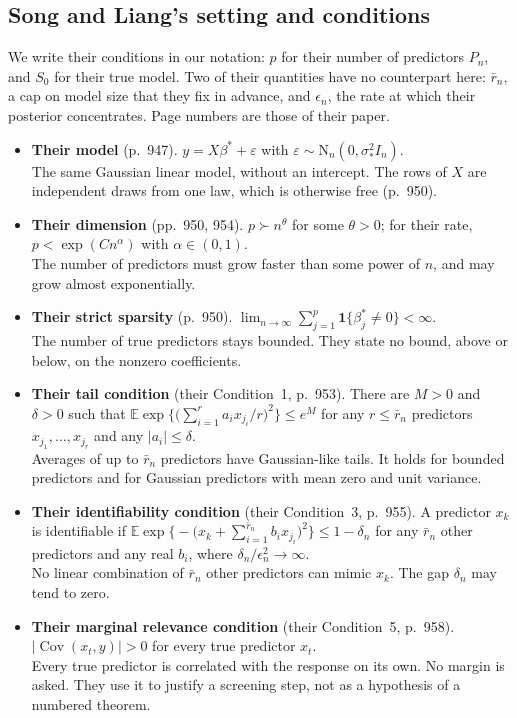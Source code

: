 \documentclass[11pt]{article}
\newcommand{\E}{\mathbb{E}}
\newcommand{\N}{\mathrm{N}}
\newcommand{\abs}[1]{\lvert #1\rvert}
\newcommand{\ind}[1]{\mathbf{1}\{#1\}}
\newcommand{\Cov}{\operatorname{Cov}}
\newcommand{\bstar}{\beta^*}
\newcommand{\sigs}{\sigma_*}
\newcommand{\Sz}{S_0}
\theoremstyle{plain}
\theoremstyle{definition}
\begin{document}
\subsection*{Song and Liang's setting and conditions}

We write their conditions in our notation: $p$ for their number of predictors $P_n$, and $\Sz$ for their true model.
Two of their quantities have no counterpart here: $\bar r_n$, a cap on model size that they fix in advance, and
$\epsilon_n$, the rate at which their posterior concentrates. Page numbers are those of their paper.
\begin{itemize}
  \item \textbf{Their model} (p.~947). $y=X\bstar+\varepsilon$ with $\varepsilon\sim\N_n(0,\sigs^2I_n)$.\\
    The same Gaussian linear model, without an intercept. The rows of $X$ are independent draws from one law, which is
    otherwise free (p.~950).
  \item \textbf{Their dimension} (pp.~950, 954). $p\succ n^\theta$ for some $\theta>0$; for their rate,
    $p<\exp(Cn^\alpha)$ with $\alpha\in(0,1)$.\\
    The number of predictors must grow faster than some power of $n$, and may grow almost exponentially.
  \item \textbf{Their strict sparsity} (p.~950). $\lim_{n\to\infty}\sum_{j=1}^{p}\ind{\beta^*_j\neq0}<\infty$.\\
    The number of true predictors stays bounded. They state no bound, above or below, on the nonzero coefficients.
  \item \textbf{Their tail condition} (their Condition~1, p.~953). There are $M>0$ and $\delta>0$ such that
    $\E\exp\big\{\big(\sum_{i=1}^{r}a_ix_{j_i}/r\big)^2\big\}\le e^{M}$ for any $r\le\bar r_n$ predictors
    $x_{j_1},\dots,x_{j_r}$ and any $\abs{a_i}\le\delta$.\\
    Averages of up to $\bar r_n$ predictors have Gaussian-like tails. It holds for bounded predictors and for Gaussian
    predictors with mean zero and unit variance.
  \item \textbf{Their identifiability condition} (their Condition~3, p.~955). A predictor $x_k$ is identifiable if
    $\E\exp\big\{-\big(x_k+\sum_{i=1}^{\bar r_n}b_ix_{j_i}\big)^2\big\}\le1-\delta_n$ for any $\bar r_n$ other
    predictors and any real $b_i$, where $\delta_n/\epsilon_n^2\to\infty$.\\
    No linear combination of $\bar r_n$ other predictors can mimic $x_k$. The gap $\delta_n$ may tend to zero.
  \item \textbf{Their marginal relevance condition} (their Condition~5, p.~958). $\abs{\Cov(x_t,y)}>0$ for every true
    predictor $x_t$.\\
    Every true predictor is correlated with the response on its own. No margin is asked. They use it to justify a
    screening step, not as a hypothesis of a numbered theorem.
\end{itemize}
\end{document}
